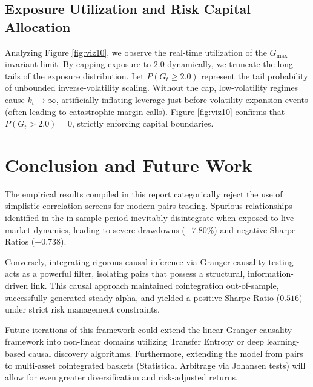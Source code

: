 \documentclass[12pt,a4paper]{article}
\begin{document}
\subsection{Exposure Utilization and Risk Capital Allocation}
Analyzing Figure \ref{fig:viz10}, we observe the real-time utilization of the $G_{\text{max}}$ invariant limit. By capping exposure to $2.0$ dynamically, we truncate the long tails of the exposure distribution. Let $P(G_t \ge 2.0)$ represent the tail probability of unbounded inverse-volatility scaling. Without the cap, low-volatility regimes cause $k_t \to \infty$, artificially inflating leverage just before volatility expansion events (often leading to catastrophic margin calls). Figure \ref{fig:viz10} confirms that $P(G_t > 2.0) = 0$, strictly enforcing capital boundaries.

\section{Conclusion and Future Work}
The empirical results compiled in this report categorically reject the use of simplistic correlation screens for modern pairs trading. Spurious relationships identified in the in-sample period inevitably disintegrate when exposed to live market dynamics, leading to severe drawdowns ($-7.80\%$) and negative Sharpe Ratios ($-0.738$).

Conversely, integrating rigorous causal inference via Granger causality testing acts as a powerful filter, isolating pairs that possess a structural, information-driven link. This causal approach maintained cointegration out-of-sample, successfully generated steady alpha, and yielded a positive Sharpe Ratio ($0.516$) under strict risk management constraints.

Future iterations of this framework could extend the linear Granger causality framework into non-linear domains utilizing Transfer Entropy or deep learning-based causal discovery algorithms. Furthermore, extending the model from pairs to multi-asset cointegrated baskets (Statistical Arbitrage via Johansen tests) will allow for even greater diversification and risk-adjusted returns.
\end{document}
